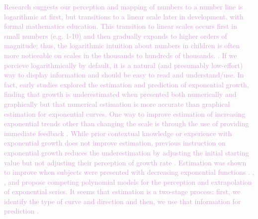 \documentclass[]{interact}
\theoremstyle{plain}%
\theoremstyle{definition}
\theoremstyle{remark}
\begin{document}
\textcolor{Plum}{
Research suggests our perception and mapping of numbers to a number line is logarithmic at first, but transitions to a linear scale later in development, with formal mathematics education.
This transition to linear scales occurs first in small numbers (e.g. 1-10) and then gradually expands to higher orders of magnitude; thus, the logarithmic intuition about numbers in children is often more noticeable on scales in the thousands to hundreds of thousands. \citep{varshney_why_2013, siegler_numerical_2017, dehaeneLogLinearDistinct2008}.
If we percieve logarithmically by default, it is a natural (and presumably low-effort) way to display information and should be easy to read and understand/use.}
\textcolor{Plum}{In fact, early studies explored the estimation and prediction of exponential growth, finding that growth is underestimated when presented both numerically and graphically but that numerical estimation is more accurate than graphical estimation for exponential curves.
One way to improve estimation of increasing exponential trends other than changing the scale is through the use of providing immediate feedback \citep{mackinnon_feedback_1991}.
While prior contextual knowledge or experience with exponential growth does not improve estimation, previous instruction on exponential growth reduces the underestimation by adjusting the initial starting value but not adjusting their perception of growth rate
\citep{wagenaar_misperception_1975, jones_polynomial_1977}.
Estimation was shown to improve when subjects were presented with decreasing exponential functions \citep{timmers_inverse_1977}.
\cite{jones_polynomial_1977}, \cite{wagenaar_extrapolation_1978}, and \cite{jones_generalized_1979} propose competing polynomial models for the perception and extrapolation of exponential series.
It seems that estimation is a two-stage process: first, we identify the type of curve and direction and then, we use that information for prediction \citep{best_perception_2007}.
}
\end{document}
